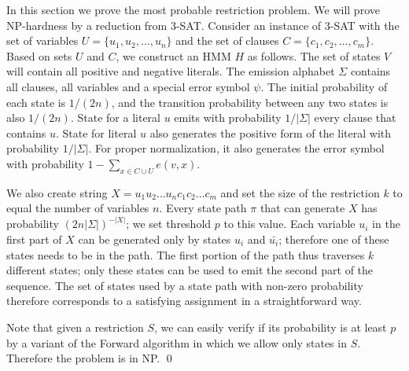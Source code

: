 In this section we prove the most probable restriction problem.
We will prove NP-hardness by a reduction from 3-SAT. Consider an
instance of 3-SAT with the set of variables $U=\{u_1,u_2,\dots,u_n\}$
and the set of clauses $C=\{c_1,c_2,\dots,c_m\}$. 
Based on sets $U$ and $C$, we construct an HMM $H$ as
follows.  The set of states $V$ will contain all positive and negative
literals. The emission alphabet $\Sigma$ contains all clauses, all
variables and a special error symbol $\psi$. The initial probability
of each state is $1/(2n)$, and the transition probability
between any two states is also $1/(2n)$. State for a literal
$u$ emits with probability $1/|\Sigma|$ every clause that contains $u$.
State for literal $u$ also generates the positive form of the literal
with probability $1/|\Sigma|$. For proper normalization, 
it also generates the error symbol 
with probability $1-\sum_{x\in C\cup U}e(v,x)$. 

We also create string $X=u_1u_2\dots
u_nc_1c_2\dots c_m$ and set the size of the restriction $k$ to equal
the number of variables $n$. Every state path $\pi$ that can generate
$X$ has probability $(2n|\Sigma|)^{-|X|}$; we set threshold $p$ to
this value. Each 
variable $u_i$ in the first part of $X$ 
can be generated only by states $u_i$ and
$\bar{u_i}$; therefore one of these states needs to be in the
path. The first portion of the path thus traverses $k$ 
different states; only these states can be used to emit the second part of the
sequence. 
The set of states used by a state path with
non-zero probability therefore corresponds to a satisfying assignment
in a straightforward way. 

Note that given a restriction $S$, we can easily verify if its
probability is at least $p$ by a variant of the Forward algorithm
in which we allow only states in $S$. Therefore the problem is in NP.
\qed

